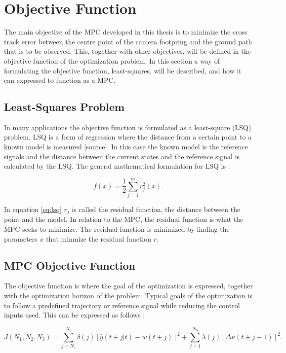 \section{Objective Function}
\label{ch:objective_function}

The main objective of the MPC developed in this thesis is to minimize the cross track error between the centre point of the camera footpring and the ground path that is to be observed. This, together with other objectives, will be defined in the objective function of the optimization problem. In this section a way of formulating the objective function, least-squares, will be described, and how it can expressed to function as a MPC.


\subsection{Least-Squares Problem}

In many applications the objective function is formulated as a least-square (LSQ) problem. LSQ is a form of regression where the distance from a certain point to a known model is measured [source]. In this case the known model is the reference signals and the distance between the current states and the reference signal is calculated by the LSQ. The general mathematical formulation for LSQ is \cite{nocedalOPTIMIZATION}:

\begin{equation}
	\label{eq:lsq}
	f(x) = \frac{1}{2} \sum_{j=1}^m r_j^2(x).
\end{equation}

In equation \ref{eq:lsq} $r_j$ is called the residual function, the distance between the point and the model. In relation to the MPC, the residual function is what the MPC seeks to minimize. The residual function is minimized by finding the parameters $x$ that minmize the residual function $r$.

\subsection{MPC Objective Function}

The objective function is where the goal of the optimization is expressed, together with the optimization horizon of the problem. Typical goals of the optimization is to follow a predefined trajectory or reference signal while reducing the control inputs used. This can be expressed as follows \cite{mpcCAMACHO}:

\begin{equation}
	\label{eq:mpc_cost}
	J(N_1, N_2, N_3) = \sum_{j=N_1}^{N_2} \delta(j)[\hat{y}(t+j|t)-w(t+j)]^2 + 
	\sum_{j=1}^{N_u}\lambda(j)[\Delta u(t+j-1)]^2.
\end{equation}


